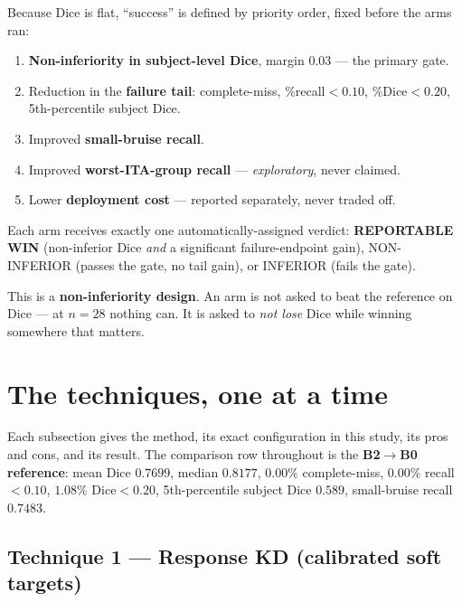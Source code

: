 \documentclass[11pt]{article}
\newcommand{\win}[1]{\textcolor{wingreen}{\textbf{#1}}}
\newcommand{\lose}[1]{\textcolor{losered}{#1}}
\begin{document}
Because Dice is flat, ``success'' is defined by priority order, fixed before the arms ran:

\begin{enumerate}[leftmargin=1.8em,itemsep=2pt]
  \item \textbf{Non-inferiority in subject-level Dice}, margin $0.03$ --- the primary gate.
  \item Reduction in the \textbf{failure tail}: complete-miss, \%recall$<0.10$, \%Dice$<0.20$,
        5th-percentile subject Dice.
  \item Improved \textbf{small-bruise recall}.
  \item Improved \textbf{worst-ITA-group recall} --- \emph{exploratory}, never claimed.
  \item Lower \textbf{deployment cost} --- reported separately, never traded off.
\end{enumerate}

Each arm receives exactly one automatically-assigned verdict:
\win{REPORTABLE WIN} (non-inferior Dice \emph{and} a significant failure-endpoint gain),
NON-INFERIOR (passes the gate, no tail gain), or \lose{INFERIOR} (fails the gate).

\begin{keybox}
This is a \textbf{non-inferiority design}. An arm is not asked to beat the reference on Dice --- at
$n=28$ nothing can. It is asked to \emph{not lose} Dice while winning somewhere that matters.
\end{keybox}

\section{The techniques, one at a time}

Each subsection gives the method, its exact configuration in this study, its pros and cons, and its
result. The comparison row throughout is the \textbf{B2$\to$B0 reference}: mean Dice $0.7699$,
median $0.8177$, $0.00\%$ complete-miss, $0.00\%$ recall$<0.10$, $1.08\%$ Dice$<0.20$,
5th-percentile subject Dice $0.589$, small-bruise recall $0.7483$.

\subsection{Technique 1 --- Response KD (calibrated soft targets)}
\end{document}
